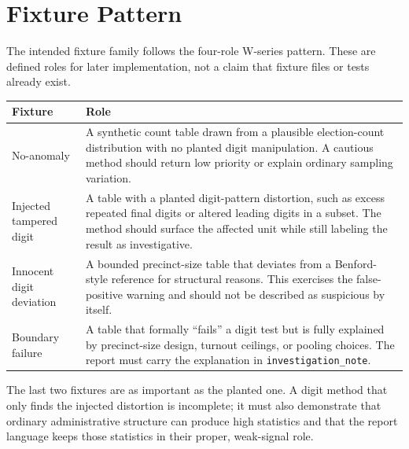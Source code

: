 \section{Fixture Pattern}

The intended fixture family follows the four-role W-series pattern. These are
defined roles for later implementation, not a claim that fixture files or tests
already exist.

\begin{center}
\small
\begin{tabularx}{\textwidth}{lX}
\toprule
Fixture & Role \\
\midrule
No-anomaly & A synthetic count table drawn from a plausible election-count
distribution with no planted digit manipulation. A cautious method should return
low priority or explain ordinary sampling variation. \\
Injected tampered digit & A table with a planted digit-pattern distortion, such
as excess repeated final digits or altered leading digits in a subset. The
method should surface the affected unit while still labeling the result as
investigative. \\
Innocent digit deviation & A bounded precinct-size table that deviates from a
Benford-style reference for structural reasons. This exercises the false-positive
warning and should not be described as suspicious by itself. \\
Boundary failure & A table that formally ``fails'' a digit test but is fully
explained by precinct-size design, turnout ceilings, or pooling choices. The
report must carry the explanation in \texttt{investigation\_note}. \\
\bottomrule
\end{tabularx}
\end{center}

The last two fixtures are as important as the planted one. A digit method that
only finds the injected distortion is incomplete; it must also demonstrate that
ordinary administrative structure can produce high statistics and that the
report language keeps those statistics in their proper, weak-signal role.

